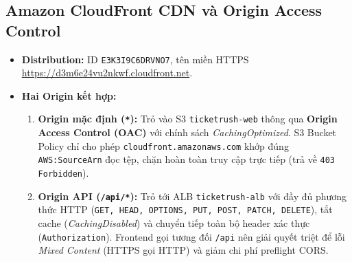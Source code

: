 \subsection{Amazon CloudFront CDN và Origin Access Control}
\begin{itemize}[leftmargin=1.5em]
  \item \textbf{Distribution:} ID \texttt{E3K3I9C6DRVNO7}, tên miền HTTPS \url{https://d3m6e24vu2nkwf.cloudfront.net}.
  \item \textbf{Hai Origin kết hợp:}
    \begin{enumerate}[leftmargin=1.5em]
      \item \textbf{Origin mặc định (\texttt{*}):} Trỏ vào S3 \texttt{ticketrush-web} thông qua \textbf{Origin Access Control (OAC)} với chính sách \textit{CachingOptimized}. S3 Bucket Policy chỉ cho phép \texttt{cloudfront.amazonaws.com} khớp đúng \texttt{AWS:SourceArn} đọc tệp, chặn hoàn toàn truy cập trực tiếp (trả về \texttt{403 Forbidden}).
      \item \textbf{Origin API (\texttt{/api/*}):} Trỏ tới ALB \texttt{ticketrush-alb} với đầy đủ phương thức HTTP (\texttt{GET, HEAD, OPTIONS, PUT, POST, PATCH, DELETE}), tắt cache (\textit{CachingDisabled}) và chuyển tiếp toàn bộ header xác thực (\texttt{Authorization}). Frontend gọi tương đối \texttt{/api} nên giải quyết triệt để lỗi \textit{Mixed Content} (HTTPS gọi HTTP) và giảm chi phí preflight CORS.
    \end{enumerate}
\end{itemize}


